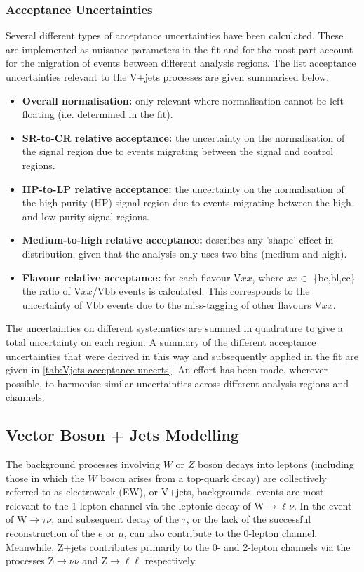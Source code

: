 \subsubsection{Acceptance Uncertainties}
Several different types of acceptance uncertainties have been calculated. These are implemented as nuisance parameters in the fit and for the most part account for the migration of events between different analysis regions. The list acceptance uncertainties relevant to the V+jets processes are given summarised below.
%
\begin{itemize}
    \item \textbf{Overall normalisation:} only relevant where normalisation cannot be left floating (i.e. determined in the fit).
    \item \textbf{SR-to-CR relative acceptance:} the uncertainty on the normalisation of the signal region due to events migrating between the signal and control regions.
    \item \textbf{HP-to-LP relative acceptance:} the uncertainty on the normalisation of the high-purity (HP) signal region due to events migrating between the high- and low-purity signal regions.
    \item \textbf{Medium-to-high} \pTV \textbf{relative acceptance:} describes any 'shape' effect in \pTV distribution, given that the analysis only uses two \pTV bins (medium and high).
    \item \textbf{Flavour relative acceptance:} for each flavour V$xx$, where $xx\in$ \{bc,bl,cc\} the ratio of V$xx$/Vbb events is calculated. This corresponds to the uncertainty of Vbb events due to the miss-tagging of other flavours V$xx$. 
\end{itemize}
%
The uncertainties on different systematics are summed in quadrature to give a total uncertainty on each region. A summary of the different acceptance uncertainties that were derived in this way and subsequently applied in the fit are given in \cref{tab:Vjets acceptance uncerts}. An effort has been made, wherever possible, to harmonise similar uncertainties across different analysis regions and channels.


\subsection{Vector Boson + Jets Modelling}
The background processes involving $W$ or $Z$ boson decays into leptons (including those in which the $W$ boson arises from a top-quark decay) are collectively referred to as electroweak (EW), or V+jets, backgrounds. \Wjets events are most relevant to the 1-lepton channel via the leptonic decay of W$\rightarrow \ell\nu$. In the event of W$\rightarrow \tau\nu$, and subsequent decay of the $\tau$, or the lack of the successful reconstruction of the $e$ or $\mu$, \Wjets can also contribute to the 0-lepton channel. Meanwhile, Z+jets contributes primarily to the 0- and 2-lepton channels via the processes Z$\rightarrow \nu\nu$ and Z$\rightarrow \ell\ell$ respectively.

